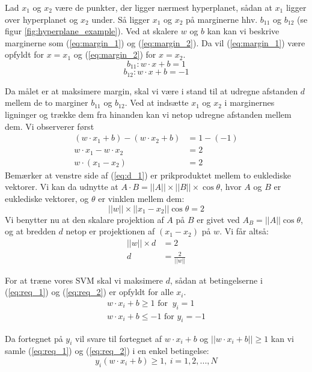 \documentclass{article}
\begin{document}
Lad $x_1$ og $x_2$ være de punkter, der ligger nærmest hyperplanet, sådan at $x_1$ ligger over hyperplanet og $x_2$ under. Så ligger $x_1$ og $x_2$ på marginerne hhv. $b_{11}$ og $b_{12}$ (se figur \ref{fig:hyperplane_example}). Ved at skalere $w$ og $b$ kan kan vi beskrive marginerne som (\ref{eq:margin_1}) og (\ref{eq:margin_2}). Da vil (\ref{eq:margin_1}) være opfyldt for $x=x_1$ og (\ref{eq:margin_2}) for $x=x_2$.
\begin{equation}
\label{eq:margin_1}
b_{11}: w\cdot x + b = 1
\end{equation}
\begin{equation}
\label{eq:margin_2}
b_{12}: w\cdot x + b = -1
\end{equation}

Da målet er at maksimere margin, skal vi være i stand til at udregne afstanden $d$ mellem de to marginer $b_{11}$ og $b_{12}$. Ved at indsætte $x_1$ og $x_2$ i marginernes ligninger og trække dem fra hinanden kan vi netop udregne afstanden mellem dem. Vi observerer først
\begin{align}
(w\cdot x_1 + b) - (w\cdot x_2 +b) &= 1 - (-1)\\
w\cdot x_1 - w\cdot x_2 &= 2\\
w\cdot(x_1-x_2)&=2
\label{eq:d_1}
\end{align}
Bemærker at venstre side af (\ref{eq:d_1}) er prikproduktet mellem to euklediske vektorer. Vi kan da udnytte at $A\cdot B = ||A||\times||B||\times\cos\theta$, hvor $A$ og $B$ er euklediske vektorer, og $\theta$ er vinklen mellem dem:
\begin{equation}
||w||\times||x_1-x_2||\cos\theta=2
\end{equation}
Vi benytter nu at den skalare projektion af $A$ på $B$ er givet ved $A_B=||A||\cos\theta$, og at bredden $d$ netop er projektionen af $(x_1-x_2)$ på $w$. Vi får altså:
\begin{align}
||w||\times d &= 2\\
\label{eq:d_2}
d&=\frac{2}{||w||}
\end{align}


For at træne vores SVM skal vi maksimere $d$, sådan at betingelserne i (\ref{eq:req_1}) og (\ref{eq:req_2}) er opfyldt for alle $x_i$.
\begin{align}
\label{eq:req_1}
w \cdot x_i + b \geq 1 \text{ for } \ y_i = 1\\
\label{eq:req_2}
w \cdot x_i + b \leq -1 \text{ for } y_i = -1
\end{align}

Da fortegnet på $y_i$ vil svare til fortegnet af $w\cdot x_i+b$ og $||w\cdot x_i+b||\geq 1$ kan vi samle (\ref{eq:req_1}) og (\ref{eq:req_2}) i en enkel betingelse:
\begin{equation}
\label{eq:req_final}
y_i(w \cdot x_i + b) \geq 1, \ i =1,2,...,N
\end{equation}
\end{document}
